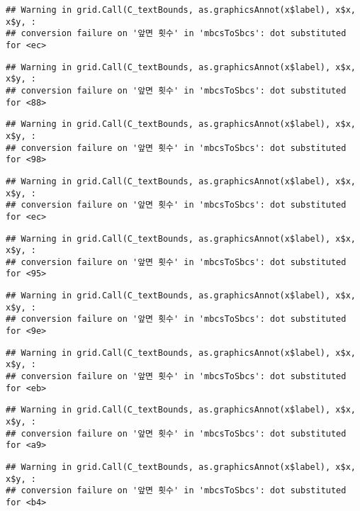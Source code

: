 \documentclass[]{book}
\begin{document}
\begin{verbatim}
## Warning in grid.Call(C_textBounds, as.graphicsAnnot(x$label), x$x, x$y, :
## conversion failure on '앞면 횟수' in 'mbcsToSbcs': dot substituted for <ec>
\end{verbatim}

\begin{verbatim}
## Warning in grid.Call(C_textBounds, as.graphicsAnnot(x$label), x$x, x$y, :
## conversion failure on '앞면 횟수' in 'mbcsToSbcs': dot substituted for <88>
\end{verbatim}

\begin{verbatim}
## Warning in grid.Call(C_textBounds, as.graphicsAnnot(x$label), x$x, x$y, :
## conversion failure on '앞면 횟수' in 'mbcsToSbcs': dot substituted for <98>
\end{verbatim}

\begin{verbatim}
## Warning in grid.Call(C_textBounds, as.graphicsAnnot(x$label), x$x, x$y, :
## conversion failure on '앞면 횟수' in 'mbcsToSbcs': dot substituted for <ec>
\end{verbatim}

\begin{verbatim}
## Warning in grid.Call(C_textBounds, as.graphicsAnnot(x$label), x$x, x$y, :
## conversion failure on '앞면 횟수' in 'mbcsToSbcs': dot substituted for <95>
\end{verbatim}

\begin{verbatim}
## Warning in grid.Call(C_textBounds, as.graphicsAnnot(x$label), x$x, x$y, :
## conversion failure on '앞면 횟수' in 'mbcsToSbcs': dot substituted for <9e>
\end{verbatim}

\begin{verbatim}
## Warning in grid.Call(C_textBounds, as.graphicsAnnot(x$label), x$x, x$y, :
## conversion failure on '앞면 횟수' in 'mbcsToSbcs': dot substituted for <eb>
\end{verbatim}

\begin{verbatim}
## Warning in grid.Call(C_textBounds, as.graphicsAnnot(x$label), x$x, x$y, :
## conversion failure on '앞면 횟수' in 'mbcsToSbcs': dot substituted for <a9>
\end{verbatim}

\begin{verbatim}
## Warning in grid.Call(C_textBounds, as.graphicsAnnot(x$label), x$x, x$y, :
## conversion failure on '앞면 횟수' in 'mbcsToSbcs': dot substituted for <b4>
\end{verbatim}
\end{document}
